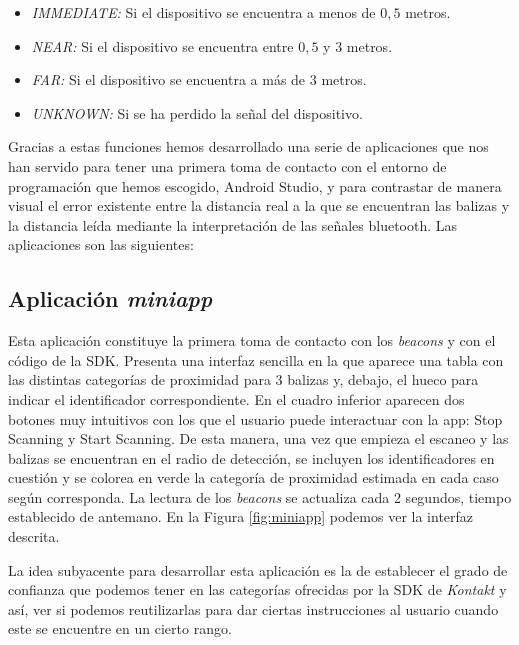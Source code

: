 \begin{itemize}
	\item \textit{IMMEDIATE:} Si el dispositivo se encuentra a menos de $0,5$ metros.
	\item \textit{NEAR:} Si el dispositivo se encuentra entre $0,5$ y $3$ metros.
	\item \textit{FAR:} Si el dispositivo se encuentra a más de $3$ metros.
	\item \textit{UNKNOWN:} Si se ha perdido la señal del dispositivo.
\end{itemize}

Gracias a estas funciones hemos desarrollado una serie de aplicaciones que nos han servido para tener una primera toma de contacto con el entorno de programación que hemos escogido, Android Studio, y para contrastar de manera visual el error existente entre la distancia real a la que se encuentran las balizas y la distancia leída mediante la interpretación de las señales bluetooth. Las aplicaciones son las siguientes:

\subsection{Aplicación \textit{miniapp}}
Esta aplicación constituye la primera toma de contacto con los \textit{beacons} y con el código de la SDK. Presenta una interfaz sencilla en la que aparece una tabla con las distintas categorías de proximidad para 3 balizas y, debajo, el hueco para indicar el identificador correspondiente. En el cuadro inferior aparecen dos botones muy intuitivos con los que el usuario puede interactuar con la app: Stop Scanning y Start Scanning. De esta manera, una vez que empieza el escaneo y las balizas se encuentran en el radio de detección, se incluyen los identificadores en cuestión y se colorea en verde la categoría de proximidad estimada en cada caso según corresponda. La lectura de los \textit{beacons} se actualiza cada 2 segundos, tiempo establecido de antemano. En la Figura \ref{fig:miniapp} podemos ver la interfaz descrita.

La idea subyacente para desarrollar esta aplicación es la de establecer el grado de confianza que podemos tener en las categorías ofrecidas por la SDK de \textit{Kontakt} y así, ver si podemos reutilizarlas para dar ciertas instrucciones al usuario cuando este se encuentre en un cierto rango. %

